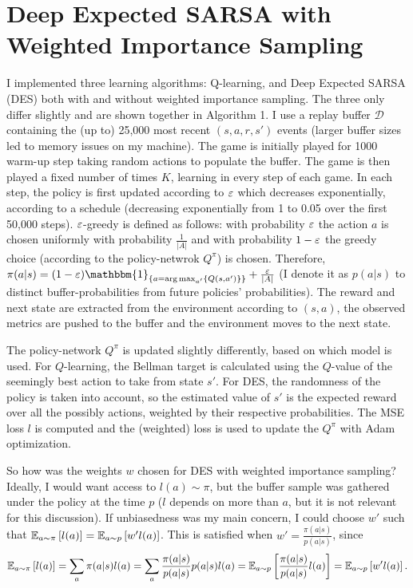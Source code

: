 \documentclass{article}
\begin{document}
\section{Deep Expected SARSA with Weighted Importance Sampling}
I implemented three learning algorithms: Q-learning, and Deep Expected SARSA (DES) both with and without weighted importance sampling. The three only differ slightly and are shown together in Algorithm 1.
I use a replay buffer \(\mathcal{D}\) containing the (up to) 25,000 most recent \((s, a, r, s')\) events (larger buffer sizes led to memory issues on my machine). The game is initially played for 1000 warm-up step taking random actions to populate the buffer. The game is then played a fixed number of times \(K\), learning in every step of each game. In each step, the policy is first updated according to \(\varepsilon\) which decreases exponentially, according to a schedule (decreasing exponentially from 1 to 0.05 over the first 50,000 steps). \(\varepsilon\)-greedy is defined as follows: with probability \(\varepsilon\) the action \(a\) is chosen uniformly with probability \(\frac{1}{|A|}\) and with probability \(1-\varepsilon\) the greedy choice (according to the policy-netwrok \(Q^\pi\)) is chosen. Therefore, \(\pi(a|s) = (1 - \eps) \mathbbm{1}_{\set{a = \arg\max_{a'}\set{Q(s,a')}}} + \frac{\eps}{|A|}\) (I denote it as \(p(a|s)\) to distinct buffer-probabilities from future policies' probabilities). The reward and next state are extracted from the environment according to \((s,a)\), the observed metrics are pushed to the buffer and the environment moves to the next state.

The policy-network \(Q^\pi\) is updated slightly differently, based on which model is used. For \(Q\)-learning, the Bellman target is calculated using the \(Q\)-value of the seemingly best action to take from state \(s'\). For DES, the randomness of the policy is taken into account, so the estimated value of \(s'\) is the expected reward over all the possibly actions, weighted by their respective probabilities. The MSE loss \(l\) is computed and the (weighted) loss is used to update the \(Q^\pi\) with Adam optimization.

So how was the weights \(w\) chosen for DES with weighted importance sampling? Ideally, I would want access to \(l(a) \sim \pi\), but the buffer sample was gathered under the policy at the time \(p\) (\(l\) depends on more than \(a\), but it is not relevant for this discussion). If unbiasedness was my main concern, I could choose \(w'\) such that \(\mathbb{E}_{a \sim \pi} \left[ l(a) \right] = \mathbb{E}_{a \sim p} \left[ w' l(a) \right]\). This is satisfied when \(w' = \frac{\pi(a|s)}{p(a|s)}\), since
\[
    \mathbb{E}_{a \sim \pi}\left[ l(a) \right]
    = \sum_{a} {\pi(a|s) l(a)}
    = \sum_{a} {\frac{\pi(a|s)}{p(a|s)} p(a|s) l(a)}
    = \mathbb{E}_{a \sim p} \left[ \frac{\pi(a|s)}{p(a|s)} l(a) \right]
    = \mathbb{E}_{a \sim p} \left[ w' l(a) \right].
\]
\end{document}

